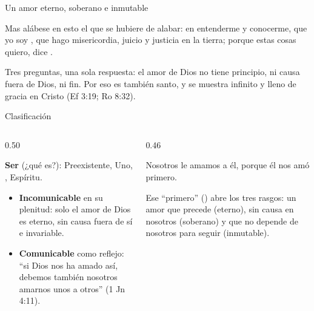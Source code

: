 \begin{frame}{Un amor eterno, soberano e inmutable}
\centering
{}\par\medskip
\begin{cita}Mas alábese en esto el que se hubiere de alabar: en entenderme y conocerme, que yo soy \SENOR, que hago misericordia, juicio y justicia en la tierra; porque estas cosas quiero, dice \SENOR.\end{cita}
\scriptsize Tres preguntas, una sola respuesta: el amor de Dios no tiene principio, ni causa fuera de Dios, ni fin. Por eso es también santo, y se muestra infinito y lleno de gracia en Cristo (Ef 3:19; Ro 8:32).
\end{frame}

\begin{frame}{Clasificación}
\begin{columns}[c,onlytextwidth]
\begin{column}{0.50\textwidth}
\begin{tcolorbox}[colback=papiro,colframe=dorado,boxrule=1.2pt,arc=3pt]
\small\textbf{\textcolor{azul}{Ser}} (¿qué es?): Preexistente, Uno, , Espíritu.
\end{tcolorbox}
\small\begin{itemize}
\item \textbf{Incomunicable} en su plenitud: solo el amor de Dios es eterno, sin causa fuera de sí e invariable.
\item \textbf{Comunicable} como reflejo: ``si Dios nos ha amado así, debemos también nosotros amarnos unos a otros'' (1 Jn 4:11).
\end{itemize}
\end{column}
\begin{column}{0.46\textwidth}
\begin{cita}Nosotros le amamos a él, porque él nos amó primero.\end{cita}
\small Ese ``primero'' () abre los tres rasgos: un amor que precede (eterno), sin causa en nosotros (soberano) y que no depende de nosotros para seguir (inmutable).\par\medskip
{}
\end{column}
\end{columns}
\end{frame}

